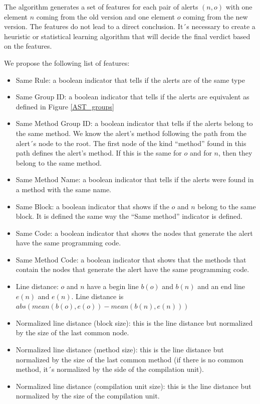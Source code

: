 \documentclass[
]{article}
\begin{document}
\normalsize

The algorithm generates a set of features for each pair of alerts
\((n,o)\) with one element \(n\) coming from the old version and one
element \(o\) coming from the new version. The features do not lead to a
direct conclusion. It´s necessary to create a heuristic or statistical
learning algorithm that will decide the final verdict based on the
features.

We propose the following list of features:

\begin{itemize}
\item
  Same Rule: a boolean indicator that tells if the alerts are of the
  same type
\item
  Same Group ID: a boolean indicator that tells if the alerts are
  equivalent as defined in Figure \ref{AST_groups}
\item
  Same Method Group ID: a boolean indicator that tells if the alerts
  belong to the same method. We know the alert's method following the
  path from the alert´s node to the root. The first node of the kind
  ``method'' found in this path defines the alert's method. If this is
  the same for \(o\) and for \(n\), then they belong to the same method.
\item
  Same Method Name: a boolean indicator that tells if the alerts were
  found in a method with the same name.
\item
  Same Block: a boolean indicator that shows if the \(o\) and \(n\)
  belong to the same block. It is defined the same way the ``Same
  method'' indicator is defined.
\item
  Same Code: a boolean indicator that shows the nodes that generate the
  alert have the same programming code.
\item
  Same Method Code: a boolean indicator that shows that the methods that
  contain the nodes that generate the alert have the same programming
  code.
\item
  Line distance: \(o\) and \(n\) have a begin line \(b(o)\) and \(b(n)\)
  and an end line \(e(n)\) and \(e(n)\). Line distance is
  \(abs(mean(b(o), e(o)) - mean(b(n), e(n)))\)
\item
  Normalized line distance (block size): this is the line distance but
  normalized by the size of the last common node.
\item
  Normalized line distance (method size): this is the line distance but
  normalized by the size of the last common method (if there is no
  common method, it´s normalized by the side of the compilation unit).
\item
  Normalized line distance (compilation unit size): this is the line
  distance but normalized by the size of the compilation unit.
\end{itemize}
\end{document}

